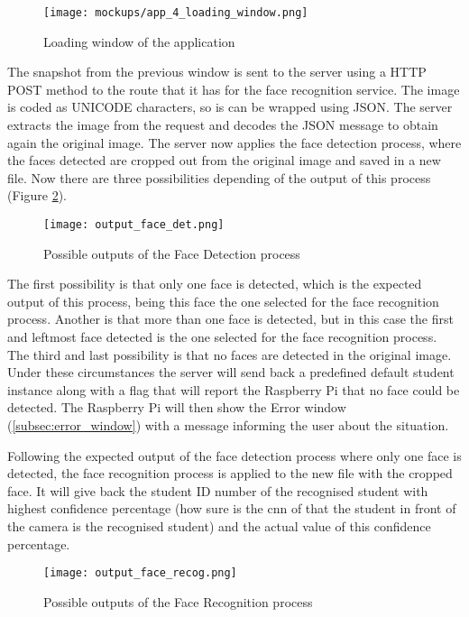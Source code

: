 	\begin{figure}[!ht]
		\centering
		\texttt{[image: mockups/app\_4\_loading\_window.png]}
		\caption{Loading window of the application}
		\label{fig:loading_window}
	\end{figure}

	The snapshot from the previous window is sent to the server using a HTTP POST method to the route that it has for the face recognition service. The image is coded as UNICODE characters, so is can be wrapped using JSON. The server extracts the image from the request and decodes the JSON message to obtain again the original image. The server now applies the face detection process, where the faces detected are cropped out from the original image and saved in a new file. Now there are three possibilities depending of the output of this process (Figure \ref{fig:output_face_det}).

	\begin{figure}[!ht]
		\centering
		\texttt{[image: output\_face\_det.png]}
		\caption{Possible outputs of the Face Detection process}
		\label{fig:output_face_det}
	\end{figure}

	The first possibility is that only one face is detected, which is the expected output of this process, being this face the one selected for the face recognition process. Another is that more than one face is detected, but in this case the first and leftmost face detected is the one selected for the face recognition process. The third and last possibility is that no faces are detected in the original image. Under these circumstances the server will send back a predefined default student instance along with a flag that will report the Raspberry Pi that no face could be detected. The Raspberry Pi will then show the Error window (\ref{subsec:error_window}) with a message informing the user about the situation.

	Following the expected output of the face detection process where only one face is detected, the face recognition process is applied to the new file with the cropped face. It will give back the student ID number of the recognised student with highest confidence percentage (how sure is the \gls{cnn} of that the student in front of the camera is the recognised student) and the actual value of this confidence percentage. 

	\begin{figure}[!ht]
		\centering
		\texttt{[image: output\_face\_recog.png]}
		\caption{Possible outputs of the Face Recognition process}
		\label{fig:output_face_recog}
	\end{figure}

